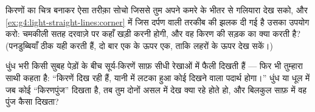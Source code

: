 \begin{exercise}[$\star\star$]\label{exo:g4:light-straight-lines:10}
किरणों का चित्र बनाकर ऐसा तरीक़ा सोचो जिससे तुम अपने कमरे के भीतर से
गलियारा देख सको, और \cref{ex:g4:light-straight-lines:corner} में
जिस दर्पण वाली तरकीब की झलक दी गई है उसका उपयोग करो: चमकीली सतह
दरवाज़े पर कहाँ खड़ी करनी होगी, और वह किरण की सड़क का क्या करती है?
(पनडुब्बियाँ ठीक यही करती हैं, दो बार एक के ऊपर एक, ताकि लहरों के
ऊपर देख सकें।)
\end{exercise}

\begin{exercise}[$\star\star$]\label{exo:g4:light-straight-lines:11}
धुंध भरी किसी सुबह पेड़ों के बीच सूर्य-किरणें साफ़ सीधी रेखाओं में
फैली दिखती हैं --- फिर भी तुम्हारा साथी कहता है: ``किरणें दिख रही
हैं, यानी   में लटका हुआ कोई दिखने वाला पदार्थ होगा।'' धुंध
या धूल में जब कोई ``किरणपुंज'' दिखता है, तब तुम दोनों असल में देख
क्या रहे होते हो, और बिलकुल साफ़  में वह पुंज कैसा दिखता?
\end{exercise}

